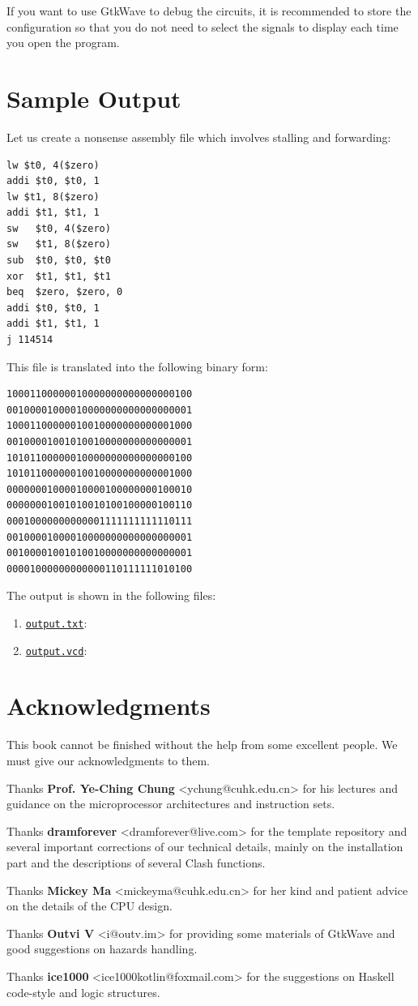 \documentclass[a4paper,12pt, oneside]{book}
\begin{document}
If you want to use GtkWave to debug the circuits, it is recommended to store the configuration so that you do not need to select the signals to display each time you open the program.

\chapter{Sample Output}
Let us create a nonsense assembly file which involves stalling and forwarding:
\begin{verbatim}
lw $t0, 4($zero)
addi $t0, $t0, 1
lw $t1, 8($zero)
addi $t1, $t1, 1
sw   $t0, 4($zero)
sw   $t1, 8($zero)
sub  $t0, $t0, $t0
xor  $t1, $t1, $t1
beq  $zero, $zero, 0
addi $t0, $t0, 1
addi $t1, $t1, 1
j 114514
\end{verbatim}
This file is translated into the following binary form:
\begin{verbatim}
10001100000010000000000000000100
00100001000010000000000000000001
10001100000010010000000000001000
00100001001010010000000000000001
10101100000010000000000000000100
10101100000010010000000000001000
00000001000010000100000000100010
00000001001010010100100000100110
00010000000000001111111111110111
00100001000010000000000000000001
00100001001010010000000000000001
00001000000000000110111111010100
\end{verbatim}
The output is shown in the following files:
\begin{enumerate}
	\item \href{https://yifan.cowtransfer.com/s/166018e0ad394b}{\texttt{output.txt}}: 
	\item \href{https://yifan.cowtransfer.com/s/e10ff6693c3149}{\texttt{output.vcd}}: 
\end{enumerate}
\chapter{Acknowledgments}
This book cannot be finished without the help from some excellent people. We must give our acknowledgments to them.

Thanks \textbf{Prof. Ye-Ching Chung} <ychung@cuhk.edu.cn> for his lectures and guidance on the microprocessor architectures and instruction sets.

Thanks \textbf{dramforever} <dramforever@live.com> for the template repository and several important corrections of our technical details, mainly on the installation part and the descriptions of several Clash functions.

Thanks \textbf{Mickey Ma} <mickeyma@cuhk.edu.cn> for her kind and patient advice on the details of the CPU design.

Thanks \textbf{Outvi V} <i@outv.im> for providing some materials of GtkWave and good suggestions on hazards handling.

Thanks \textbf{ice1000} <ice1000kotlin@foxmail.com> for the suggestions on Haskell code-style and logic structures.
\end{document}
